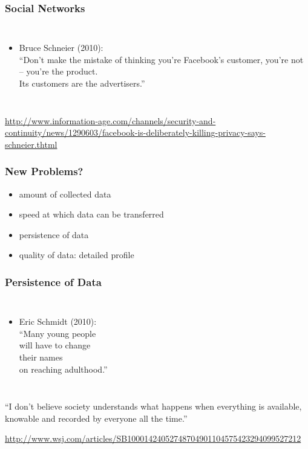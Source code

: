 \documentclass[dvipsnames]{beamer}
\theoremstyle{plain}
\begin{document}
\begin{frame}
  \frametitle{Social Networks}

  \begin{columns}

    \begin{itemize}
      \item Bruce Schneier (2010):\\
        \smallskip
        ``Don't make the mistake of thinking you're Facebook's customer,
        you're not\\
        -- you're the product.\\
        \smallskip
        Its customers are the advertisers.''
    \end{itemize}
  \end{columns}

  \medskip
  \tiny{\url{http://www.information-age.com/channels/security-and-continuity/news/1290603/facebook-is-deliberately-killing-privacy-says-schneier.thtml}}\\
\end{frame}

\begin{frame}
  \frametitle{New Problems?}

  \begin{itemize}
    \item amount of collected data
    \item speed at which data can be transferred
    \item persistence of data
    \item quality of data: detailed profile
  \end{itemize}
\end{frame}

\begin{frame}
  \frametitle{Persistence of Data}

  \begin{columns}

    \begin{itemize}
      \item Eric Schmidt (2010):\\
        \smallskip
        ``Many young people\\
        will have to change\\
        their names\\
        on reaching adulthood.''
    \end{itemize}
  \end{columns}

  \pause
  \medskip
  ``I don't believe society understands what happens when everything is
    available, knowable and recorded by everyone all the time.''

  \medskip
  \tiny{\url{http://www.wsj.com/articles/SB10001424052748704901104575423294099527212}}\\
\end{frame}
\end{document}
